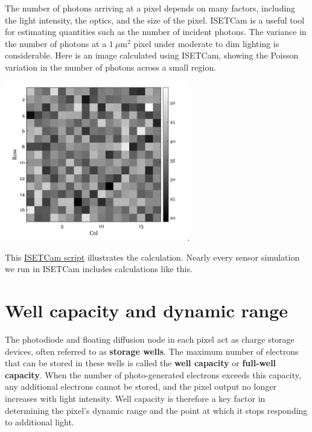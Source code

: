 \documentclass[
  letterpaper,
]{book}
\begin{document}
\begin{tcolorbox}[enhanced jigsaw, opacityback=0, breakable, coltitle=black, leftrule=.75mm, left=2mm, colframe=quarto-callout-note-color-frame, opacitybacktitle=0.6, bottomtitle=1mm, bottomrule=.15mm, toprule=.15mm, title=\textcolor{quarto-callout-note-color}{\faInfo}\hspace{0.5em}{Photons per pixel}, titlerule=0mm, toptitle=1mm, colback=white, rightrule=.15mm, colbacktitle=quarto-callout-note-color!10!white, arc=.35mm]

The number of photons arriving at a pixel depends on many factors,
including the light intensity, the optics, and the size of the pixel.
ISETCam is a useful tool for estimating quantities such as the number of
incident photons. The variance in the number of photons at a
\(1~\mu\text{m}^2\) pixel under moderate to dim lighting is
considerable. Here is an image calculated using ISETCam, showing the
Poisson variation in the number of photons across a small region.

\includegraphics[width=0.6\textwidth,height=\textheight]{chapters/images/sensors/15-parameters/03-photonimage.png}.

This \href{../code/fise_opticsCountingPhotons.html}{ISETCam script}
illustrates the calculation. Nearly every sensor simulation we run in
ISETCam includes calculations like this.

\end{tcolorbox}

\section{Well capacity and dynamic
range}\label{sec-wellcapacity-dynamicrange}

The photodiode and floating diffusion node in each pixel act as charge
storage devices, often referred to as \textbf{storage wells}. The
maximum number of electrons that can be stored in these wells is called
the \textbf{well capacity} or \textbf{full-well capacity}. When the
number of photo-generated electrons exceeds this capacity, any
additional electrons cannot be stored, and the pixel output no longer
increases with light intensity. Well capacity is therefore a key factor
in determining the pixel's dynamic range and the point at which it stops
responding to additional light.
\end{document}

